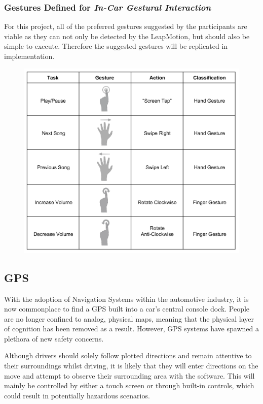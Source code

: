 \documentclass{l4proj}
\begin{document}
\subsubsection{Gestures Defined for \it{In-Car Gestural Interaction}}
For this project, all of the preferred gestures suggested by the participants are viable as they can not only be detected by the LeapMotion, but should also be simple to execute. Therefore the suggested gestures will be replicated in implementation.
\begin{figure}[h!]
\centering
\includegraphics[width=6in]{images/LeapMusicGestures.png}
\label{fig:leapmusic}
\end{figure}
\newpage

\vspace{-3mm}
\subsection{GPS}
\vspace{-3mm}
With the adoption of Navigation Systems within the automotive industry, it is now commonplace to find a GPS built into a car's central console dock. People are no longer confined to analog, physical maps, meaning that the physical layer of cognition has been removed as a result. However, GPS systems have spawned a plethora of new safety concerns.

Although drivers should solely follow plotted directions and remain attentive to their surroundings whilst driving, it is likely that they will enter directions on the move and attempt to observe their surrounding area with the software. This will mainly be controlled by either a touch screen or through built-in controls, which could result in potentially hazardous scenarios.
\end{document}

